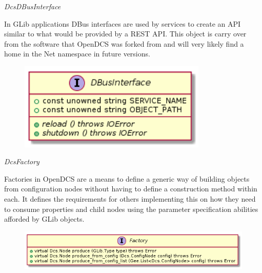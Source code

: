       \emph{DcsDBusInterface}

      \vspace*{-0.75cm}
      \begin{minipage}[t]{0.5\textwidth}
      	\vspace*{0.5cm}
        In GLib applications DBus interfaces are used by services to create an
        API similar to what would be provided by a REST API. This object is
        carry over from the software that OpenDCS was forked from and will very
        likely find a home in the Net namespace in future versions.
      \end{minipage} \hfill
      \begin{minipage}[t]{0.45\textwidth}
        \begin{figure}[H]
          \includegraphics[width=0.8\textwidth]{figures/design/class/core/dbus-interface}
          \label{fig:dsg-classes-dbus-interface}
        \end{figure}
      \end{minipage}

      \emph{DcsFactory}

      \vspace*{-0.75cm}
      \begin{minipage}[t]{0.5\textwidth}
      	\vspace*{0.5cm}
        Factories in OpenDCS are a means to define a generic way of building
        objects from configuration nodes without having to define a construction
        method within each. It defines the requirements for others implementing
        this on how they need to consume properties and child nodes using the
        parameter specification abilities afforded by GLib objects.
      \end{minipage} \hfill
      \begin{minipage}[t]{0.45\textwidth}
        \begin{figure}[H]
          \includegraphics[width=\textwidth]{figures/design/class/core/factory}
          \label{fig:dsg-classes-factory}
        \end{figure}
      \end{minipage}

